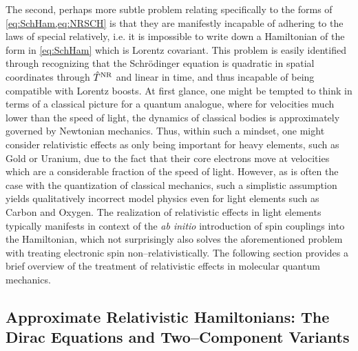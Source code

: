 The second, perhaps more subtle problem relating specifically to the forms of \cref{eq:SchHam,eq:NRSCH} is that they are manifestly
incapable of adhering to the laws of special relatively, i.e. it is impossible to write down a Hamiltonian of the form in
\cref{eq:SchHam} which is Lorentz covariant. This problem is easily identified through recognizing that the Schr\"{o}dinger
equation is quadratic in spatial coordinates through $\hat{T}^{\mathrm{NR}}$ and linear in time, and thus incapable of being compatible with Lorentz boosts. At first glance,
one might be tempted to think in terms of a classical picture for a quantum analogue, where for velocities much lower than the speed of light,
the dynamics of classical bodies is approximately governed by Newtonian mechanics. Thus, within such a mindset, one might consider
relativistic effects as only being important for heavy elements, such as Gold or Uranium, due to the fact that their core electrons
move at velocities which are a considerable fraction of the speed of light. However, as is often the case with the quantization
of classical mechanics, such a simplistic assumption yields qualitatively incorrect model physics even for light elements such as Carbon and Oxygen.
The realization of relativistic effects in light elements typically manifests in context of the \emph{ab initio} introduction of spin couplings
into the Hamiltonian, which not surprisingly also solves the aforementioned problem with treating electronic spin non--relativistically. 
The following section provides a brief overview of the treatment of relativistic effects in molecular quantum mechanics.







\subsection{Approximate Relativistic Hamiltonians: The Dirac Equations and Two--Component Variants}
\label{sec:RELH}

